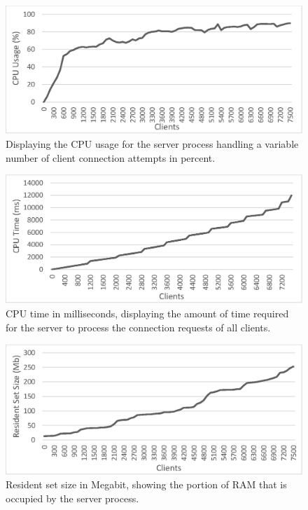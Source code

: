 \documentclass[bsc, 12pt, twoside, singlespacing, parskip, abbrevs, notimes, normalheadings, logo]{styles/infthesis}
\begin{document}
\begin{figure}[H]
\centering
\includegraphics[scale=0.9]{images/test_CLIENT_CPUusage.eps}
\caption{Displaying the CPU usage for the server process handling a variable number of client connection attempts in percent.}
\label{fig:cpu_usage}
\vspace{1em}
\end{figure}

\begin{figure}[H]
\centering
\includegraphics[scale=0.9]{images/test_CLIENT_CPUtime.eps}
\caption{CPU time in milliseconds, displaying the amount of time required for the server to process the connection requests of all clients.}
\label{fig:cpu_time}
\end{figure}

\begin{figure}[H]
\centering
\includegraphics[scale=0.9]{images/test_CLIENT_RSS.eps}
%
\caption{Resident set size in Megabit, showing the portion of RAM that is occupied by the server process.}
\label{fig:cpu_rss}
\end{figure}
\end{document}
